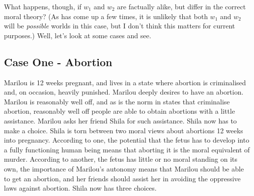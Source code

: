 What happens, though, if $w_1$ and $w_2$ are factually alike, but differ in the correct moral theory? (As has come up a few times, it is unlikely that both $w_1$ and $w_2$ will be \emph{possible} worlds in this case, but I don't think this matters for current purposes.) Well, let's look at some cases and see.

\subsection{Case One - Abortion}
\label{caseone-abortion}

\gls{Marilou} is 12 weeks pregnant, and lives in a state where abortion is criminalised and, on occasion, heavily punished. \gls{Marilou} deeply desires to have an abortion. \gls{Marilou} is reasonably well off, and as is the norm in states that criminalise abortion, reasonably well off people are able to obtain abortions with a little assistance. \gls{Marilou} asks her friend \gls{Shila} for such assistance. \gls{Shila} now has to make a choice. \gls{Shila} is torn between two moral views about abortions 12 weeks into pregnancy. According to one, the potential that the fetus has to develop into a fully functioning human being means that aborting it is the moral equivalent of murder. According to another, the fetus has little or no moral standing on its own, the importance of \gls{Marilou}'s autonomy means that \gls{Marilou} should be able to get an abortion, and her friends should assist her in avoiding the oppressive laws against abortion. \gls{Shila} now has three choices.

\renewcommand{\labelenumi}{\Alph{enumi}.}

